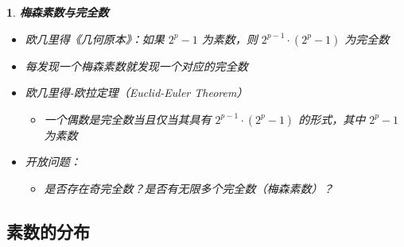 \documentclass[UTF8]{report}
\theoremstyle{MyLineTheoremStyle} %
\theoremstyle{MyBlockTheoremStyle} %
\theoremstyle{MySubsubsectionStyle} %
\newtheorem{definition}{}
\begin{document}
\begin{definition}
    \textbf{梅森素数与完全数}
    \begin{itemize}
        \item 欧几里得《几何原本》：如果 $2^p - 1$ 为素数，则 $2^{p-1} \cdot (2^p - 1)$ 为完全数
        \item 每发现一个梅森素数就发现一个对应的完全数
        \item 欧几里得-欧拉定理（Euclid-Euler Theorem）
        \begin{itemize}
            \item 一个偶数是完全数当且仅当其具有 $2^{p-1} \cdot (2^p - 1)$ 的形式，其中 $2^p - 1$ 为素数
        \end{itemize}
        \item 开放问题：
        \begin{itemize}
            \item 是否存在奇完全数？是否有无限多个完全数（梅森素数）？
        \end{itemize}
    \end{itemize}
\end{definition}

\subsection{素数的分布}
\end{document}

